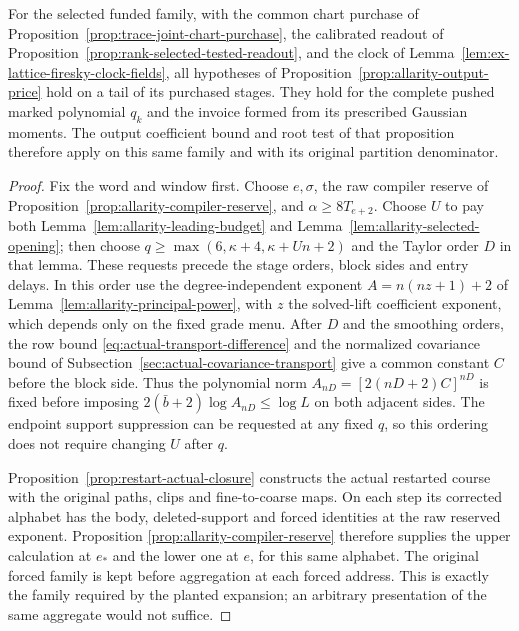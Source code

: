 \begin{proposition}
\label{prop:allarity-selected-application}
For the selected funded family, with the common chart purchase of
Proposition~\ref{prop:trace-joint-chart-purchase}, the calibrated readout
of Proposition~\ref{prop:rank-selected-tested-readout}, and the clock
of Lemma~\ref{lem:ex-lattice-firesky-clock-fields}, all hypotheses of
Proposition~\ref{prop:allarity-output-price} hold on a tail of its
purchased stages. They hold for the complete pushed marked polynomial
$q_k$ and the invoice formed from its prescribed Gaussian moments.
The output coefficient bound and root test of that proposition
therefore apply on this same family and with its original partition
denominator.
\end{proposition}
\begin{proof}
Fix the word and window first. Choose $e,\sigma$, the raw compiler
reserve of Proposition~\ref{prop:allarity-compiler-reserve}, and
$\alpha\ge8T_{e+2}$. Choose $U$ to pay both
Lemma~\ref{lem:allarity-leading-budget} and
Lemma~\ref{lem:allarity-selected-opening}; then choose
$q\ge\max(6,\kappa+4,\kappa+Un+2)$ and the Taylor order $D$ in that
lemma. These requests precede the stage orders, block sides and entry
delays. In this order use the degree-independent exponent
$A=n(nz+1)+2$ of Lemma~\ref{lem:allarity-principal-power}, with $z$
the solved-lift coefficient exponent, which depends only on the fixed
grade menu. After $D$ and the smoothing orders, the row bound
\eqref{eq:actual-transport-difference} and the normalized covariance
bound of Subsection~\ref{sec:actual-covariance-transport} give a common
constant $C$ before the block side. Thus the polynomial norm
$A_{nD}=[2(nD+2)C]^{nD}$ is fixed before imposing
$2(\bar b+2)\log A_{nD}\le\log L$ on both adjacent sides. The endpoint support suppression can be requested at any
fixed $q$, so this ordering does not require changing $U$ after $q$.

Proposition~\ref{prop:restart-actual-closure} constructs the actual
restarted course with the original paths, clips and fine-to-coarse
maps. On each step its corrected alphabet has the body, deleted-support
and forced identities at the raw reserved exponent. Proposition
\ref{prop:allarity-compiler-reserve} therefore supplies the upper
calculation at $e_*$ and the lower one at $e$, for this same alphabet.
The original forced family is kept before aggregation at each forced
address. This is exactly the family required by the planted expansion;
an arbitrary presentation of the same aggregate would not suffice.


\end{proof}

